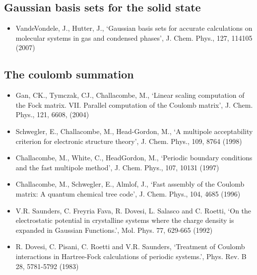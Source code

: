 \documentclass{report}
\begin{document}
\subsection{Gaussian basis sets for the solid state}
\begin{itemize}
\item VandeVondele, J., Hutter, J., `Gaussian basis sets for accurate calculations on molecular systems in gas and condensed phases', J. Chem. Phys., 127, 114105 (2007)
\end{itemize}

\subsection{The coulomb summation}

\begin{itemize}
\item Gan, CK., Tymczak, CJ., Challacombe, M., `Linear scaling computation of the Fock matrix. VII. Parallel computation of the Coulomb matrix', J. Chem. Phys., 121, 6608, (2004)

\item Schwegler, E., Challacombe, M., Head-Gordon, M., `A multipole acceptability criterion for electronic structure theory', J. Chem. Phys., 109, 8764 (1998)

\item Challacombe, M., White, C., HeadGordon, M., `Periodic boundary conditions and the fast multipole method', J. Chem. Phys., 107, 10131 (1997)

\item Challacombe, M., Schwegler, E., Almlof, J., `Fast assembly of the Coulomb matrix: A quantum chemical tree code', J. Chem. Phys., 104, 4685 (1996)

\item V.R. Saunders, C. Freyria Fava, R. Dovesi, L. Salasco and C. Roetti, `On the electrostatic potential in crystalline systems where the charge density is expanded in Gaussian Functions.', Mol. Phys. 77, 629-665 (1992)

\item R. Dovesi, C. Pisani, C. Roetti and V.R. Saunders, `Treatment of Coulomb interactions in Hartree-Fock calculations of periodic systems.', Phys. Rev. B 28, 5781-5792 (1983)

\end{itemize}
\end{document}
